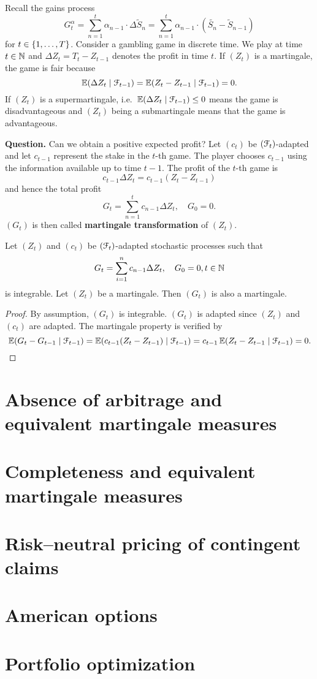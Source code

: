 \documentclass[12pt]{amsart}
\begin{document}
\begin{remark}
    Recall the gains process \[
        G_t^\alpha = \sum_{n=1}^t \alpha_{n-1} \cdot \Delta \tilde{S}_n = \sum_{n=1}^t \alpha_{n-1} \cdot (\tilde{S_n}-\tilde{S}_{n-1})
    \]
    for \(t \in \left\{ 1, \dots, T \right\}\). Consider a gambling game in discrete time. We play at time \(t \in \mathbb{N}\) and \(\Delta Z_t = T_t - Z_{t-1}\) denotes the profit in time \(t\). If \((Z_t)\) is a martingale, the game is fair because \[
        \operatorname{\mathbb{E}}(\Delta Z_t \mid \mathcal{F}_{t-1}) = \operatorname{\mathbb{E}}(Z_t - Z_{t-1} \mid \mathcal{F}_{t-1}) = 0.
    \]
    If \((Z_t)\) is a supermartingale, i.e.\ \(\operatorname{\mathbb{E}}(\Delta Z_t \mid \mathcal{F}_{t-1}) \leq 0\) means the game is disadvantageous and \((Z_t)\) being a submartingale means that the game is advantageous.
\end{remark}

\textbf{Question.} Can we obtain a positive expected profit?
Let \((c_t)\) be \((\mathcal{F}_t)\)-adapted and let \(c_{t-1}\) represent the stake in the \(t\)-th game. The player chooses \(c_{t-1}\) using the information available up to time \(t-1\). The profit of the \(t\)-th game is \[
    c_{t-1} \Delta Z_t = c_{t-1} (Z_t-Z_{t-1})
\]
and hence the total profit \[
    G_t = \sum_{n=1}^t c_{n-1} \Delta Z_t , \quad G_0=0.
\]
\((G_t)\) is then called \textbf{martingale transformation} of \((Z_t)\).

\begin{theorem}
    Let \((Z_t)\) and \((c_t)\) be \((\mathcal{F}_t)\)-adapted stochastic processes such that\[
        G_t = \sum_{i=1}^n c_{n-1} \Delta Z_t, \quad G_0=0, t \in \mathbb{N}
    \]
    is integrable. Let \((Z_t)\) be a martingale. Then \((G_t)\) is also a martingale.
\end{theorem}
\begin{proof}
    By assumption, \((G_t)\) is integrable. \((G_t)\) is adapted since \((Z_t)\) and \((c_t)\) are adapted. The martingale property is verified by \[
        \operatorname{\mathbb{E}}(G_t-G_{t-1} \mid \mathcal{F}_{t-1}) = \operatorname{\mathbb{E}}(c_{t-1}(Z_t-Z_{t-1}) \mid \mathcal{F}_{t-1}) = c_{t-1} \operatorname{\mathbb{E}}(Z_t-Z_{t-1}\mid \mathcal{F}_{t-1}) = 0.
    \]
\end{proof}

\section{Absence of arbitrage and equivalent martingale measures}
\section{Completeness and equivalent martingale measures}
\section{Risk--neutral pricing of contingent claims}
\section{American options}
\section{Portfolio optimization}
\end{document}
